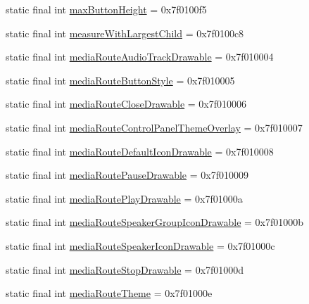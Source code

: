 \begin{CompactItemize}
\item 
static final int \hyperlink{classandroid_1_1support_1_1graphics_1_1drawable_1_1_r_1_1attr_14feab4d9177e4a9631e5848953cab0c}{maxButtonHeight} = 0x7f0100f5
\item 
static final int \hyperlink{classandroid_1_1support_1_1graphics_1_1drawable_1_1_r_1_1attr_ef0a0da26c46f26db4d62f0339526a19}{measureWithLargestChild} = 0x7f0100c8
\item 
static final int \hyperlink{classandroid_1_1support_1_1graphics_1_1drawable_1_1_r_1_1attr_5cbc67921f3759566e398fcfa3d32e6e}{mediaRouteAudioTrackDrawable} = 0x7f010004
\item 
static final int \hyperlink{classandroid_1_1support_1_1graphics_1_1drawable_1_1_r_1_1attr_5db18602177d323d2a2796a4e62df662}{mediaRouteButtonStyle} = 0x7f010005
\item 
static final int \hyperlink{classandroid_1_1support_1_1graphics_1_1drawable_1_1_r_1_1attr_a2eb5c6cccbe5492049e0d1474cb0c6c}{mediaRouteCloseDrawable} = 0x7f010006
\item 
static final int \hyperlink{classandroid_1_1support_1_1graphics_1_1drawable_1_1_r_1_1attr_09c67d08f32fccc05353386dc9702a58}{mediaRouteControlPanelThemeOverlay} = 0x7f010007
\item 
static final int \hyperlink{classandroid_1_1support_1_1graphics_1_1drawable_1_1_r_1_1attr_d29d7ca223348af6756d29faeb3de8bf}{mediaRouteDefaultIconDrawable} = 0x7f010008
\item 
static final int \hyperlink{classandroid_1_1support_1_1graphics_1_1drawable_1_1_r_1_1attr_8a0e7e6933fa5fb7a0696551ef007d09}{mediaRoutePauseDrawable} = 0x7f010009
\item 
static final int \hyperlink{classandroid_1_1support_1_1graphics_1_1drawable_1_1_r_1_1attr_81e81867b0dd9f9efe658337ac6cc8e0}{mediaRoutePlayDrawable} = 0x7f01000a
\item 
static final int \hyperlink{classandroid_1_1support_1_1graphics_1_1drawable_1_1_r_1_1attr_8c5aaea70ea1f11730e85bfa220ab428}{mediaRouteSpeakerGroupIconDrawable} = 0x7f01000b
\item 
static final int \hyperlink{classandroid_1_1support_1_1graphics_1_1drawable_1_1_r_1_1attr_a83a5610225751f658231f4ffe64d399}{mediaRouteSpeakerIconDrawable} = 0x7f01000c
\item 
static final int \hyperlink{classandroid_1_1support_1_1graphics_1_1drawable_1_1_r_1_1attr_3ffb78bc30a56065dc7aaadf2e85da0e}{mediaRouteStopDrawable} = 0x7f01000d
\item 
static final int \hyperlink{classandroid_1_1support_1_1graphics_1_1drawable_1_1_r_1_1attr_5b06a4b07031904e3669a4b5b6babbaf}{mediaRouteTheme} = 0x7f01000e

\end{CompactItemize}
